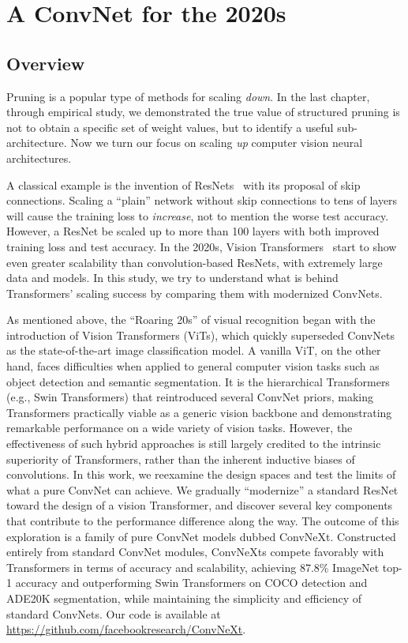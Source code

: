 \chapter{A ConvNet for the 2020s}
\label{chap:convnext}

\section{Overview}
Pruning is a popular type of methods for scaling \emph{down}. In the last chapter, through empirical study, we demonstrated the true value of structured pruning is not to obtain a specific set of weight values, but to identify a useful sub-architecture. Now we turn our focus on scaling \emph{up} computer vision neural architectures. 

A classical example is the invention of ResNets~\cite{resnet} with its proposal of skip connections. Scaling a ``plain'' network without skip connections to tens of layers will cause the training loss to \emph{increase}, not to mention the worse test accuracy. However, a ResNet be scaled up to more than 100 layers with both improved training loss and test accuracy. In the 2020s, Vision Transformers~\cite{Dosovitskiy2021} start to show even greater scalability than convolution-based ResNets, with extremely large data and models. In this study, we try to understand what is behind Transformers' scaling success by comparing them with modernized ConvNets.


As mentioned above, the ``Roaring 20s'' of visual recognition began with the introduction of Vision Transformers (ViTs), which quickly superseded ConvNets as the state-of-the-art image classification model. A vanilla ViT, on the other hand, faces difficulties when applied to general computer vision tasks such as object detection and semantic segmentation. It is the hierarchical Transformers (e.g., Swin Transformers) that reintroduced several ConvNet priors, making Transformers practically viable as a generic vision backbone and demonstrating remarkable performance on a wide variety of vision tasks. However, the effectiveness of such hybrid approaches is still largely credited to the intrinsic superiority of Transformers, rather than the inherent inductive biases of convolutions. In this work, we reexamine the design spaces and test the limits of what a pure ConvNet can achieve. We gradually ``modernize'' a standard ResNet toward the design of a vision Transformer, and discover several key components that contribute to the performance difference along the way. The outcome of this exploration is a family of pure ConvNet models dubbed ConvNeXt. Constructed entirely from standard ConvNet modules, ConvNeXts compete favorably with Transformers in terms of accuracy and scalability, achieving 87.8\% ImageNet top-1 accuracy and outperforming Swin Transformers on COCO detection and ADE20K segmentation, while maintaining the simplicity and efficiency of standard ConvNets. Our code is available at \url{https://github.com/facebookresearch/ConvNeXt}.


